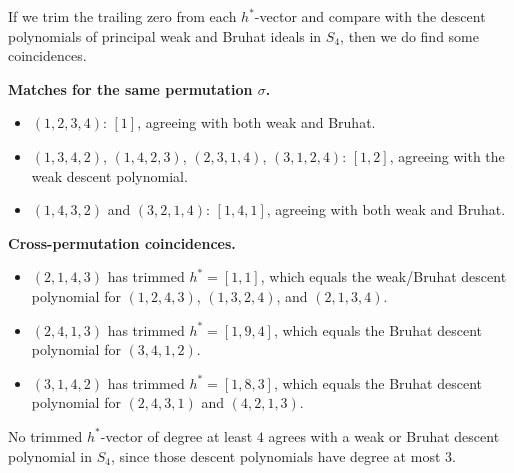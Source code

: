 \documentclass[11pt]{article}
\begin{document}
If we trim the trailing zero from each $h^*$-vector and compare with the
descent polynomials of principal weak and Bruhat ideals in $S_4$, then we do
find some coincidences.

\medskip

\noindent
\textbf{Matches for the same permutation \(\sigma\).}
\begin{itemize}
\item $(1,2,3,4)$: $[1]$, agreeing with both weak and Bruhat.
\item $(1,3,4,2)$, $(1,4,2,3)$, $(2,3,1,4)$, $(3,1,2,4)$: $[1,2]$, agreeing with the weak descent polynomial.
\item $(1,4,3,2)$ and $(3,2,1,4)$: $[1,4,1]$, agreeing with both weak and Bruhat.
\end{itemize}

\noindent
\textbf{Cross-permutation coincidences.}
\begin{itemize}
\item $(2,1,4,3)$ has trimmed $h^*=[1,1]$, which equals the weak/Bruhat descent polynomial for $(1,2,4,3)$, $(1,3,2,4)$, and $(2,1,3,4)$.
\item $(2,4,1,3)$ has trimmed $h^*=[1,9,4]$, which equals the Bruhat descent polynomial for $(3,4,1,2)$.
\item $(3,1,4,2)$ has trimmed $h^*=[1,8,3]$, which equals the Bruhat descent polynomial for $(2,4,3,1)$ and $(4,2,1,3)$.
\end{itemize}

No trimmed $h^*$-vector of degree at least $4$ agrees with a weak or Bruhat
descent polynomial in $S_4$, since those descent polynomials have degree at
most $3$.
\end{document}
